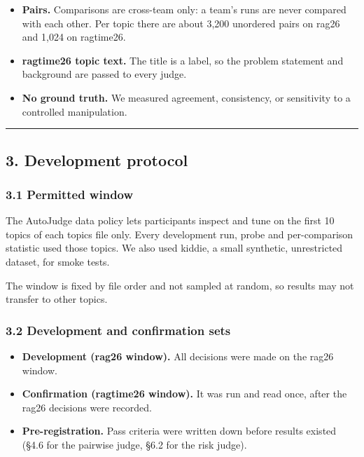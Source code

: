 \documentclass[
  10pt,
]{article}
\providecommand{\tightlist}{%
  \setlength{\itemsep}{0pt}\setlength{\parskip}{0pt}}
\begin{document}
\begin{itemize}
\tightlist
\item
  \textbf{Pairs.} Comparisons are cross-team only: a team's runs are
  never compared with each other. Per topic there are about 3,200
  unordered pairs on rag26 and 1,024 on ragtime26.
\item
  \textbf{ragtime26 topic text.} The title is a label, so the problem
  statement and background are passed to every judge.
\item
  \textbf{No ground truth.} We measured agreement, consistency, or
  sensitivity to a controlled manipulation.
\end{itemize}

\begin{center}\rule{0.5\linewidth}{0.5pt}\end{center}

\subsection{3. Development protocol}\label{development-protocol}

\subsubsection{3.1 Permitted window}\label{permitted-window}

The AutoJudge data policy lets participants inspect and tune on the
first 10 topics of each topics file only. Every development run, probe
and per-comparison statistic used those topics. We also used kiddie, a
small synthetic, unrestricted dataset, for smoke tests.

The window is fixed by file order and not sampled at random, so results
may not transfer to other topics.

\subsubsection{3.2 Development and confirmation
sets}\label{development-and-confirmation-sets}

\begin{itemize}
\tightlist
\item
  \textbf{Development (rag26 window).} All decisions were made on the
  rag26 window.
\item
  \textbf{Confirmation (ragtime26 window).} It was run and read once,
  after the rag26 decisions were recorded.
\item
  \textbf{Pre-registration.} Pass criteria were written down before
  results existed (§4.6 for the pairwise judge, §6.2 for the risk
  judge).
\end{itemize}
\end{document}
